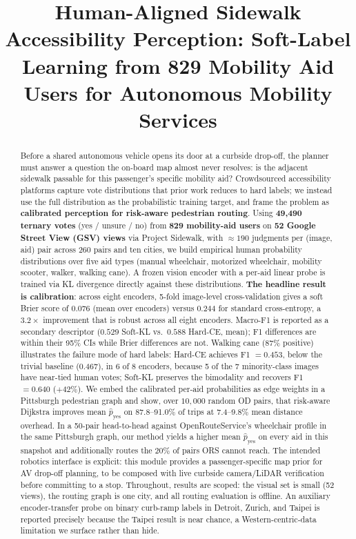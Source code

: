 \documentclass[conference]{IEEEtran}
\begin{document}
\title{Human-Aligned Sidewalk Accessibility Perception: Soft-Label Learning from 829 Mobility Aid Users for Autonomous Mobility Services}

\maketitle

\begin{abstract}
Before a shared autonomous vehicle opens its door at a curbside drop-off, the planner must answer a question the on-board map almost never resolves: is the adjacent sidewalk passable for this passenger's specific mobility aid? Crowdsourced accessibility platforms capture vote distributions that prior work reduces to hard labels; we instead use the full distribution as the probabilistic training target, and frame the problem as \textbf{calibrated perception for risk-aware pedestrian routing}. Using \textbf{49{,}490 ternary votes} (yes / unsure / no) from \textbf{829 mobility-aid users} on \textbf{52 Google Street View (GSV) views} via Project Sidewalk, with $\approx 190$ judgments per (image, aid) pair across 260 pairs and ten cities, we build empirical human probability distributions over five aid types (manual wheelchair, motorized wheelchair, mobility scooter, walker, walking cane). A frozen vision encoder with a per-aid linear probe is trained via KL divergence directly against these distributions. \textbf{The headline result is calibration}: across eight encoders, 5-fold image-level cross-validation gives a soft Brier score of $0.076$ (mean over encoders) versus $0.244$ for standard cross-entropy, a $\mathbf{3.2\times}$ improvement that is robust across all eight encoders. Macro-F1 is reported as a secondary descriptor ($0.529$ Soft-KL vs.\ $0.588$ Hard-CE, mean); F1 differences are within their 95\% CIs while Brier differences are not. Walking cane (87\% positive) illustrates the failure mode of hard labels: Hard-CE achieves F1 $=0.453$, below the trivial baseline (0.467), in 6 of 8 encoders, because 5 of the 7 minority-class images have near-tied human votes; Soft-KL preserves the bimodality and recovers F1 $= 0.640$ ($+42\%$). We embed the calibrated per-aid probabilities as edge weights in a Pittsburgh pedestrian graph and show, over $10{,}000$ random OD pairs, that risk-aware Dijkstra improves mean $\hat{p}_\mathrm{yes}$ on 87.8--91.0\% of trips at 7.4--9.8\% mean distance overhead. In a 50-pair head-to-head against OpenRouteService's wheelchair profile in the same Pittsburgh graph, our method yields a higher mean $\hat{p}_\mathrm{yes}$ on every aid in this snapshot and additionally routes the $20\%$ of pairs ORS cannot reach. The intended robotics interface is explicit: this module provides a passenger-specific map prior for AV drop-off planning, to be composed with live curbside camera/LiDAR verification before committing to a stop. Throughout, results are scoped: the visual set is small (52 views), the routing graph is one city, and all routing evaluation is offline. An auxiliary encoder-transfer probe on binary curb-ramp labels in Detroit, Zurich, and Taipei is reported precisely because the Taipei result is near chance, a Western-centric-data limitation we surface rather than hide.
\end{abstract}
\end{document}
